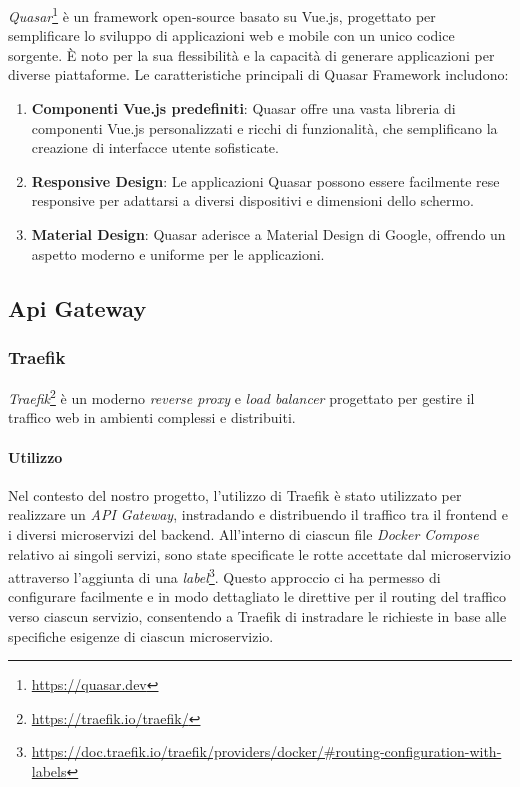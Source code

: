 \emph{Quasar}\footnote{\url{https://quasar.dev}} è un framework open-source basato su Vue.js, progettato per semplificare lo sviluppo di applicazioni web e mobile con un unico codice sorgente.
%
È noto per la sua flessibilità e la capacità di generare applicazioni per diverse piattaforme.
%
Le caratteristiche principali di Quasar Framework includono:

\begin{enumerate}
    \item \textbf{Componenti Vue.js predefiniti}: Quasar offre una vasta libreria di componenti Vue.js personalizzati e ricchi di funzionalità, che semplificano la creazione di interfacce utente sofisticate.

    \item \textbf{Responsive Design}: Le applicazioni Quasar possono essere facilmente rese responsive per adattarsi a diversi dispositivi e dimensioni dello schermo.

    \item \textbf{Material Design}: Quasar aderisce a Material Design di Google, offrendo un aspetto moderno e uniforme per le applicazioni.
\end{enumerate}

%
%
%
\subsection{Api Gateway}

\subsubsection{Traefik}

\emph{Traefik}\footnote{\url{https://traefik.io/traefik/}} è un moderno \emph{reverse proxy} e \emph{load balancer} progettato per gestire il traffico web in ambienti complessi e distribuiti.

%
%
%
\paragraph{Utilizzo}

Nel contesto del nostro progetto, l'utilizzo di Traefik è stato utilizzato per realizzare un \emph{API Gateway}, instradando e distribuendo il traffico tra il frontend e i diversi microservizi del backend.
%
All'interno di ciascun file \emph{Docker Compose} relativo ai singoli servizi, sono state specificate le rotte accettate dal microservizio attraverso l'aggiunta di una \emph{label}\footnote{\url{https://doc.traefik.io/traefik/providers/docker/\#routing-configuration-with-labels}}.
%
Questo approccio ci ha permesso di configurare facilmente e in modo dettagliato le direttive per il routing del traffico verso ciascun servizio, consentendo a Traefik di instradare le richieste in base alle specifiche esigenze di ciascun microservizio.

